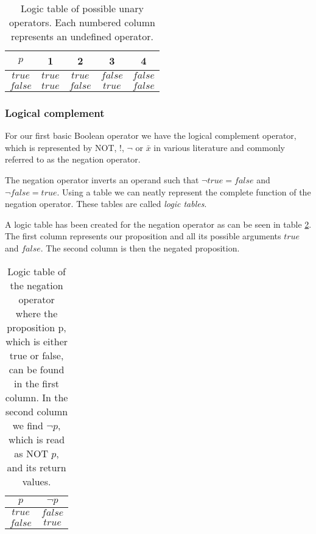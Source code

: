             \begin{table}[h!]
                \centering
                \begin{tabular}{|c||c|c|c|c|}
                	\hline
                	  $p$   &   1    &    2    &    3    & 4       \\ \hline
                	$true$  & $true$ & $true$  & $false$ & $false$ \\ \hline
                	$false$ & $true$ & $false$ & $true$  & $false$ \\ \hline
                \end{tabular}
                \caption{Logic table of possible unary operators. Each numbered column represents an undefined operator.}
                \label{LogicTable:unary}
            \end{table} 
        
            \subsubsection{Logical complement}
            
                For our first basic Boolean operator we have the logical complement operator, which is represented by NOT, !, $\neg$ or $\bar{x}$ in various literature and commonly referred to as the negation operator. 
                
                The negation operator inverts an operand such that $\neg true = false$ and $\neg false = true$.
                Using a table we can neatly represent the complete function of the negation operator. These tables are called \textit{logic tables}.
                
                A logic table has been created for the negation operator as can be seen in table \ref{LogicTable:Negation}.  The first column represents our proposition and all its possible arguments $true$ and $false$. The second column is then the negated proposition.
                
                \begin{table}[h!]
                    \centering
                    \begin{tabular}{|c|c|}
                    	\hline
                    	  $p$   & $\neg{p}$ \\ \hline
                    	$true$  &  $false$  \\ \hline
                    	$false$ &  $true$   \\ \hline
                    \end{tabular}
                    \caption{Logic table of the negation operator where the proposition p, which is either true or false, can be found in the first column. In the second column we find $\neg p$, which is read as NOT $p$, and its return values.}
                    \label{LogicTable:Negation}
                \end{table}
            
